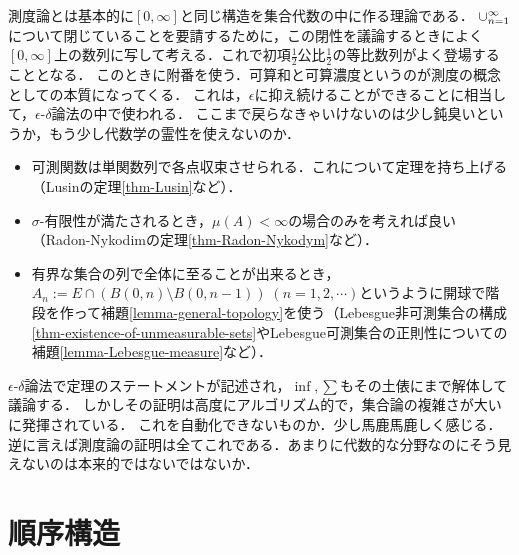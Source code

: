 \documentclass[uplatex, dvipdfmx]{jsreport}
\begin{document}
\begin{discussion}
    測度論とは基本的に$[0,\infty]$と同じ構造を集合代数の中に作る理論である．
    $\cup_{n=1}^\infty$について閉じていることを要請するために，この閉性を議論するときによく$[0,\infty]$上の数列に写して考える．これで初項$\frac{1}{2}$公比$\frac{1}{2}$の等比数列がよく登場することとなる．
    このときに附番を使う．可算和と可算濃度というのが測度の概念としての本質になってくる．
    これは，$\epsilon$に抑え続けることができることに相当して，$\epsilon$-$\delta$論法の中で使われる．
    ここまで戻らなきゃいけないのは少し鈍臭いというか，もう少し代数学の霊性を使えないのか．
    \begin{itemize}
        \item 可測関数は単関数列で各点収束させられる．これについて定理を持ち上げる（Lusinの定理\ref{thm-Lusin}など）．
        \item $\sigma$-有限性が満たされるとき，$\mu(A)<\infty$の場合のみを考えれば良い（Radon-Nykodimの定理\ref{thm-Radon-Nykodym}など）．
        \item 有界な集合の列で全体に至ることが出来るとき，$A_n:=E\cap(B(0,n)\setminus B(0,n-1))\;(n=1,2,\cdots)$というように開球で階段を作って補題\ref{lemma-general-topology}を使う（Lebesgue非可測集合の構成\ref{thm-existence-of-unmeasurable-sets}やLebesgue可測集合の正則性についての補題\ref{lemma-Lebesgue-measure}など）．
    \end{itemize}
\end{discussion}

\begin{discussion}[$\epsilon$-$\delta$]
    $\epsilon$-$\delta$論法で定理のステートメントが記述され，$\inf,\sum$もその土俵にまで解体して議論する．
    しかしその証明は高度にアルゴリズム的で，集合論の複雑さが大いに発揮されている．
    これを自動化できないものか．少し馬鹿馬鹿しく感じる．
    逆に言えば測度論の証明は全てこれである．あまりに代数的な分野なのにそう見えないのは本来的ではないではないか．
\end{discussion}

\section{順序構造}
\end{document}
